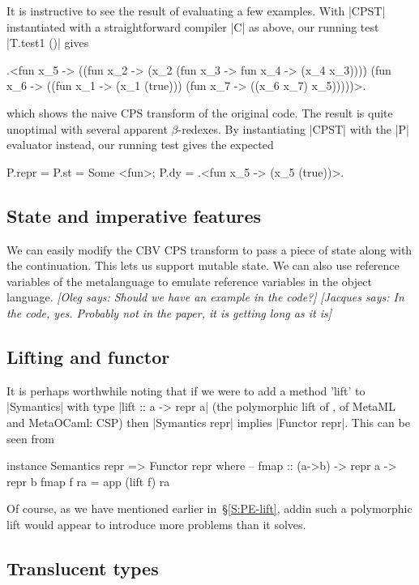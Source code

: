 \documentclass[preprint]{sigplanconf}
\newcommand{\jacques}[1]{{\it [Jacques says: #1]}}
\newcommand{\oleg}[1]{{\it [Oleg says: #1]}}
\begin{document}
It is instructive to see the result of evaluating a few examples. With 
|CPST| instantiated with a straightforward compiler |C| as above, our
running test |T.test1 ()| gives
\begin{code}
.<fun x_5 -> ((fun x_2 -> 
        (x_2 (fun x_3 -> fun x_4 -> (x_4 x_3))))
        (fun x_6 -> ((fun x_1 -> (x_1 (true))) 
        (fun x_7 -> ((x_6 x_7) x_5)))))>.
\end{code}

which shows the naive CPS transform of the original code. The result is
quite unoptimal with several apparent $\beta$-redexes. 
By instantiating |CPST| with the |P| evaluator instead, our
running test gives the expected
\begin{code}
  P.repr = {P.st = Some <fun>; P.dy = .<fun x_5 -> (x_5 (true))>.}
\end{code}

\subsection{State and imperative features}

We can easily modify the CBV CPS transform to pass a piece of state
along with the continuation. This lets us support mutable state. We
can also use reference variables of the metalanguage to emulate
reference variables in the object language.
\oleg{Should we have an example in the code?}
\jacques{In the code, yes.  Probably not in the paper, it is getting 
long as it is}

\subsection{Lifting and functor}

It is perhaps worthwhile noting that 
if we were to add a method 'lift' to |Symantics| with type
|lift :: a -> repr a| (the polymorphic lift of \citet{xi-guarded}, 
of MetaML and
MetaOCaml: CSP)
then |Symantics repr| implies |Functor repr|.  This can be seen from
\begin{code}
instance Semantics repr => Functor repr where
  -- fmap :: (a->b) -> repr a -> repr b
  fmap f ra = app (lift f) ra
\end{code}
Of course, as we have mentioned earlier in~\S\ref{S:PE-lift}, 
addin such a polymorphic lift would appear to introduce more
problems than it solves.

\subsection{Translucent types}
\end{document}
